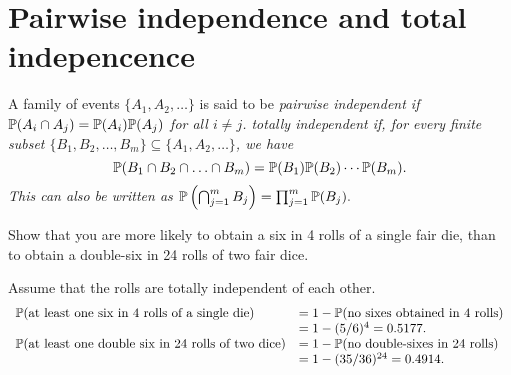\section{Pairwise independence and total indepencence}

\begin{definition}
A family of events $\{A_1,A_2,\ldots\}$ is said to be 
\ben
\it \emph{pairwise independent} if $\mathbb{P}(A_i\cap A_j)=\mathbb{P}(A_i)\mathbb{P}(A_j)$ for all $i\neq j$.
\it \emph{totally independent} if, for every finite subset 
$\{B_1,B_2,\ldots,B_m\}\subseteq \{A_1,A_2,\ldots\}$, we have
\[
\mathbb{P}(B_1\cap B_2\cap \ldots \cap B_m) = \mathbb{P}(B_1)\mathbb{P}(B_2)\cdots\mathbb{P}(B_m).
\]
This can also be written as 
$\mathbb{P}\left(\bigcap_{j=1}^m B_j\right) = \prod_{j=1}^m \mathbb{P}(B_j).$
\een
\end{definition}
%

\begin{example}[de M\'{e}r\'{e}'s Paradox]
Show that you are more likely to obtain a six in 4 rolls of a single fair die, than to obtain a double-six in 24 rolls of two fair dice.
\begin{solution}
Assume that the rolls are totally independent of each other.
\[\begin{array}{ll}
\mathbb{P}(\text{at least one six in 4 rolls of a single die)}
	& = 1- \mathbb{P}(\text{no sixes obtained in 4 rolls}) \\
	& = 1 - (5/6)^4 = 0.5177. \\
\mathbb{P}(\text{at least one double six in 24 rolls of two dice}) 
	& = 1- \mathbb{P}(\text{no double-sixes in 24 rolls}) \\
	& = 1 - (35/36)^{24}  = 0.4914. 
\end{array}\]
\end{solution}
\end{example}



